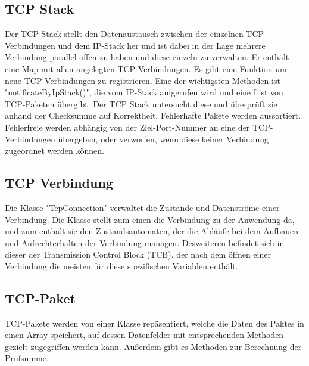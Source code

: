 \subsection{TCP Stack}
Der TCP Stack stellt den Datenaustausch zwischen der einzelnen TCP-Verbindungen und dem IP-Stack her und ist dabei in der Lage mehrere Verbindung parallel offen zu haben und diese einzeln zu verwalten. 
Er enthält eine Map mit allen angelegten TCP Verbindungen. Es gibt eine Funktion um neue TCP-Verbindungen zu registrieren. Eine der wichtigsten Methoden ist "notificateByIpStack()", die vom IP-Stack aufgerufen wird und eine List von TCP-Paketen übergibt. Der TCP Stack untersucht diese und überprüft sie anhand der Checksumme auf Korrektheit. Fehlerhafte Pakete werden aussortiert. Fehlerfreie werden abhängig von der Ziel-Port-Nummer an eine der TCP-Verbindungen übergeben, oder verworfen, wenn diese keiner Verbindung zugeordnet werden können.   

\subsection{TCP Verbindung}
Die Klasse "{}TcpConnection"{} verwaltet die Zustände und Datenströme einer Verbindung. Die Klasse stellt zum einen die Verbindung zu der Anwendung da, und zum enthält sie den Zustandsautomaten, der die Abläufe bei dem Aufbauen und Aufrechterhalten der Verbindung managen. Desweiteren befindet sich in dieser der Transmission Control Block (TCB), der nach dem öffnen einer Verbindung die meisten für diese spezifischen Variablen enthält.   

\subsection{TCP-Paket}
TCP-Pakete werden von einer Klasse repäsentiert, welche die Daten des Paktes in einen Array speichert, auf dessen Datenfelder mit entsprechenden Methoden gezielt zugegriffen werden kann. Außerdem gibt es Methoden zur Berechnung der Prüfsumme.


